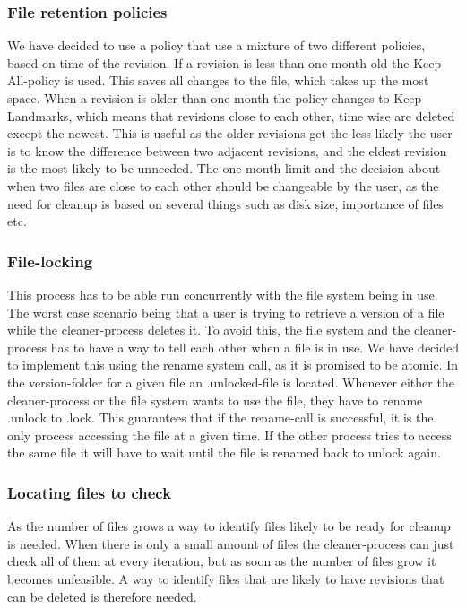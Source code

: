 \documentclass[12pt]{article}
\begin{document}
\subsubsection{File retention policies}
We have decided to use a policy that use a mixture of two different
policies, based on time of the revision. If a revision is less than
one month old the Keep All-policy is used. This saves all changes to
the file, which takes up the most space. When a revision is older than
one month the policy changes to Keep Landmarks, which means that
revisions close to each other, time wise are deleted except the
newest. This is useful as the older revisions get the less likely the
user is to know the difference between two adjacent revisions, and the
eldest revision is the most likely to be unneeded.
The one-month limit and the decision about when two files are close to
each other should be changeable by the user, as the need for cleanup
is based on several things such as disk size, importance of files etc.

\subsubsection{File-locking}
This process has to be able run concurrently with the file system
being in use. The worst case scenario being that a user is trying to
retrieve a version of a file while the cleaner-process deletes it. To
avoid this, the file system and the cleaner-process has to have a way
to tell each other when a file is in use. We have decided to implement
this using the rename system call, as it is promised to be atomic. In
the version-folder for a given file an .unlocked-file is located.
Whenever either the cleaner-process or the file system wants to use
the file, they have to rename .unlock to .lock. This guarantees that
if the rename-call is successful, it is the only process accessing the
file at a given time. If the other process tries to access the same
file it will have to wait until the file is renamed back to unlock
again.

\subsubsection{Locating files to check}
As the number of files grows a way to identify files likely to be
ready for cleanup is needed. When there is only a small amount of
files the cleaner-process can just check all of them at every
iteration, but as soon as the number of files grow it becomes
unfeasible. A way to identify files that are likely to have revisions
that can be deleted is therefore needed.
\end{document}
